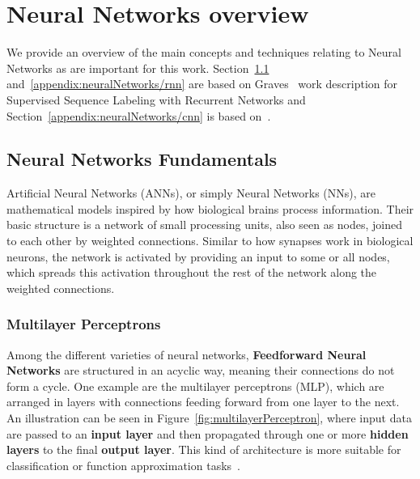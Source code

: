 \chapter{Neural Networks overview}
\label{appendix:neuralNetworks}
We provide an overview of the main concepts and techniques relating to Neural Networks as are 
important for this work. Section~\ref{appendix:neuralNetworks/fundamentals} and~\ref{appendix:neuralNetworks/rnn} 
are based on Graves~\cite{seqlab:Graves2012-385} work description for Supervised Sequence 
Labeling with Recurrent Networks and Section~\ref{appendix:neuralNetworks/cnn} is based 
on~\cite{appendix:OSheaN15}.

\section{Neural Networks Fundamentals}
\label{appendix:neuralNetworks/fundamentals}
Artificial Neural Networks (ANNs), or simply Neural Networks (NNs), are mathematical models 
inspired by how biological brains process information. Their basic structure is a network of 
small processing units, also seen as nodes, joined to each other by weighted connections. 
Similar to how synapses work in biological neurons, the network is activated by providing an 
input to some or all nodes, which spreads this activation throughout the rest of the network 
along the weighted connections.

\subsection{Multilayer Perceptrons}
\label{appendix:neuralNetworks/fundamentals/mlp}
Among the different varieties of neural networks, \textbf{Feedforward Neural Networks} are 
structured in an acyclic way, meaning their connections do not form a cycle. One example are 
the multilayer perceptrons (MLP), which are arranged in layers with connections feeding 
forward from one layer to the next. An illustration can be seen in Figure~\ref{fig:multilayerPerceptron}, 
where input data are passed to an \textbf{input layer} and then propagated through one or more 
\textbf{hidden layers} to the final \textbf{output layer}. This kind of architecture is more 
suitable for classification or function approximation tasks~\cite{seqlab:Graves2012-385}.

